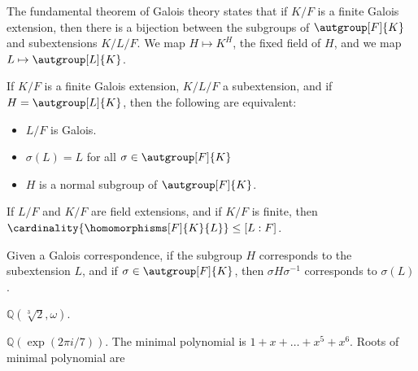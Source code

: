     The fundamental theorem of Galois theory states that if $K/F$ is a
    finite Galois extension, then there is a bijection between the subgroups
    of $\autgroup[F]{K}$ and subextensions $K/L/F$. We map
    $H\mapsto{K}^{H}$, the fixed field of $H$, and we map
    $L\mapsto\autgroup[L]{K}$.
    \begin{theorem}
        If $K/F$ is a finite Galois extension, $K/L/F$ a subextension, and
        if $H=\autgroup[L]{K}$, then the following are equivalent:
        \begin{itemize}
            \item $L/F$ is Galois.
            \item $\sigma(L)=L$ for all $\sigma\in\autgroup[F]{K}$
            \item $H$ is a normal subgroup of $\autgroup[F]{K}$.
        \end{itemize}
    \end{theorem}
    \begin{theorem}
        If $L/F$ and $K/F$ are field extensions, and if $K/F$ is finite,
        then $\cardinality{\homomorphisms[F]{K}{L}}\leq[L:F]$.
    \end{theorem}
    \begin{theorem}
        Given a Galois correspondence, if the subgroup $H$ corresponds to
        the subextension $L$, and if $\sigma\in\autgroup[F]{K}$, then
        $\sigma{H}\sigma^{\minus{1}}$ corresponds to $\sigma(L)$.
    \end{theorem}
    \begin{example}
        $\mathbb{Q}(\sqrt[3]{2},\omega)$.
    \end{example}
    \begin{example}
        $\mathbb{Q}(\exp(2\pi{i}/7))$. The minimal polynomial is
        $1+x+\dots+x^{5}+x^{6}$. Roots of minimal polynomial are 
    \end{example}
